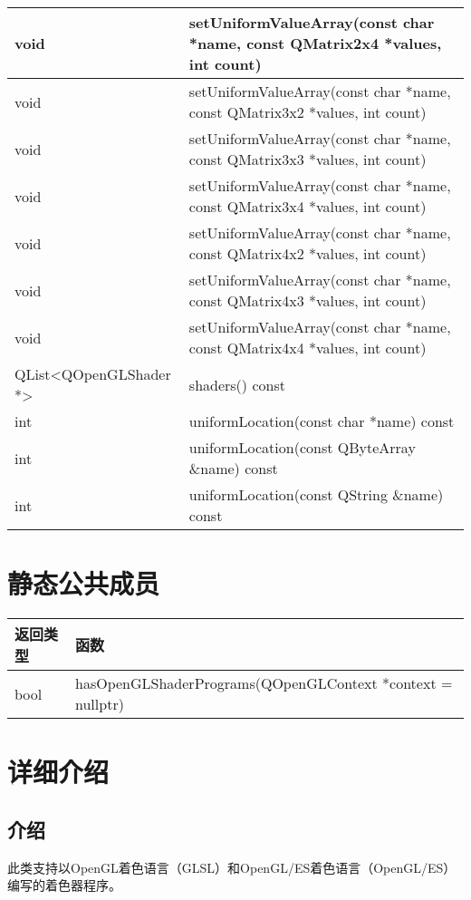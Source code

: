 \begin{longtable}[l]{|l|m{34em}|}
    \hline
    void	&setUniformValueArray(const char *name, const QMatrix2x4 *values, int count)\\
    \hline
    void&	setUniformValueArray(const char *name, const QMatrix3x2 *values, int count)\\
    \hline
    void	&setUniformValueArray(const char *name, const QMatrix3x3 *values, int count) \\ 
    \hline
    void	&setUniformValueArray(const char *name, const QMatrix3x4 *values, int count) \\ 
    \hline
    void	&setUniformValueArray(const char *name, const QMatrix4x2 *values, int count)\\ 
    \hline
    void	 &setUniformValueArray(const char *name, const QMatrix4x3 *values, int count) \\ 
    \hline
    void	& setUniformValueArray(const char *name, const QMatrix4x4 *values, int count) \\
    \hline
    QList<QOpenGLShader *>&	shaders() const \\ 
    \hline
    int	& uniformLocation(const char *name) const \\ 
    \hline
    int &	uniformLocation(const QByteArray \&name) const \\ 
    \hline
    int &	uniformLocation(const QString \&name) const \\
    \hline
    \end{longtable}

\section{静态公共成员}

\begin{tabular}[l]{|l|m{34em}|} 
    \hline
    返回类型 & 函数 \\   
    \hline
    bool &	hasOpenGLShaderPrograms(QOpenGLContext *context = nullptr) \\ 
    \hline
\end{tabular}


\section{详细介绍}

\subsection{介绍}

此类支持以OpenGL着色语言（GLSL）和OpenGL/ES着色语言（OpenGL/ES）编写的着色器程序。

